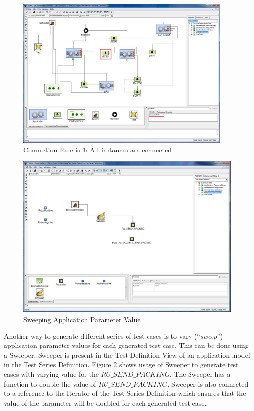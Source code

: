 \begin{figure}
	\centering
		\includegraphics[width=0.95\textwidth]{figures/ConnTSD.png}
	\caption{Connection Rule is 1: All instances are connected}
	\label{fig:ConnTSD}
\end{figure}

\begin{figure}
	\centering
		\includegraphics[width=1.00\textwidth]{figures/TSDSweep.png}
	\caption{Sweeping Application Parameter Value}
	\label{fig:TSDSweep}
\end{figure}

Another way to generate different series of test cases is to vary ("`\textit{sweep}"') application parameter values for each generated test case. This can be done using a Sweeper. Sweeper is present in the Test Definition View of an application model in the Test Series Definition. Figure \ref{fig:TSDSweep} shows usage of Sweeper to generate test cases with varying value for the $RU\_SEND\_PACKING$. The Sweeper has a function to double the value of $RU\_SEND\_PACKING$. Sweeper is also connected to a reference to the Iterator of the Test Series Definition which ensures that the value of the parameter will be doubled for each generated test case. 

